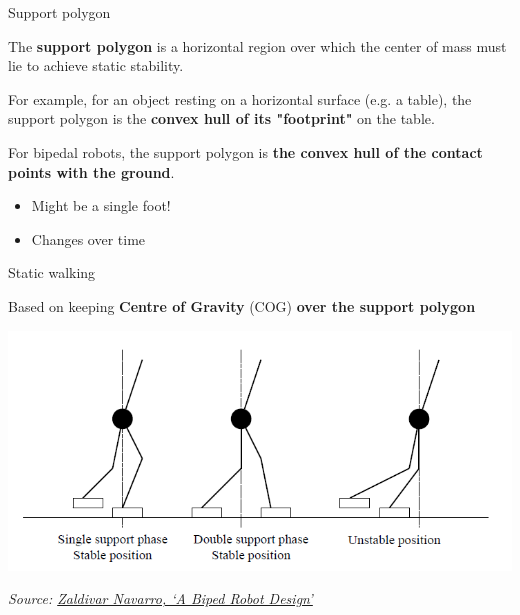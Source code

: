 \documentclass[compress]{beamer}
\newcommand{\source}[2]{{\tiny\it Source: \href{#1}{#2}}}
\begin{document}
\begin{frame}{Support polygon}

    The \textbf{support polygon} is a horizontal region over which the center of mass must lie to achieve static stability.
    
    \pause
    For example, for an object resting on a horizontal surface (e.g. a table), the support polygon is the \textbf{convex hull of its "footprint"} on the table.

    \pause
    For bipedal robots, the support polygon is \textbf{the convex hull of the contact points with the ground}.
    \begin{itemize}
        \item Might be a single foot!
        \item Changes over time
    \end{itemize}

\end{frame}
\begin{frame}{Static walking}

    Based on keeping \textbf{Centre of Gravity} (COG) \textbf{over the support polygon}

    \begin{center}
        \includegraphics[width=0.8\linewidth]{image45}
        
    \source{http://www.diss.fu-berlin.de/diss/servlets/MCRFileNodeServlet/FUDISS_derivate_000000002504/05_Kapitel5.pdf}{Zaldivar Navarro, `A Biped Robot Design'}
    \end{center}
\end{frame}

\end{document}
